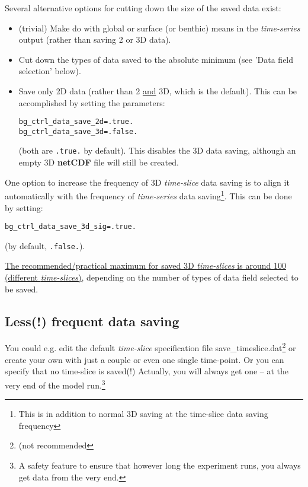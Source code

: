 \documentclass[11pt,fleqn]{book} %
\begin{document}
Several alternative options for cutting down the size of the saved data exist:

\vspace{1mm}
\begin{itemize}
\item (trivial) Make do with global or surface (or benthic) means in the \textit{time-series} output (rather than saving 2 or 3D data).
\item Cut down the types of data saved to the absolute minimum (see 'Data field selection' below).
\item Save only 2D data (rather than 2 \uline{and} 3D, which is the default). This can be accomplished by setting the parameters:
\vspace{-1mm}\begin{verbatim}
bg_ctrl_data_save_2d=.true.
bg_ctrl_data_save_3d=.false.
\end{verbatim}\vspace{-1mm}
(both are \texttt{.true.} by default). This disables the 3D data saving, although an empty 3D \textbf{netCDF} file will still be created.
\end{itemize}

\noindent One option to increase the frequency of 3D \textit{time-slice} data saving is to align it automatically with the frequency of \textit{time-series} data saving\footnote{This is in addition to normal 3D saving at the time-slice data saving frequency}. This can be done by setting:
\vspace{-1mm}\begin{verbatim}
bg_ctrl_data_save_3d_sig=.true.
\end{verbatim}\vspace{-1mm}
(by default, \texttt{.false.}).

\vspace{1mm}
\uline{The recommended/practical maximum for saved 3D \textit{time-slices} is around 100 (different \textit{time-slices})}, depending on the number of types of data field selected to be saved.

%
\subsection{Less(!) frequent data saving}

You could e.g. edit the default \textit{time-slice} specification file \textsf{\footnotesize save\_timeslice.dat}\footnote{(not recommended} or create your own with just a couple or even one single time-point. Or you can specify that no time-slice is saved(!) Actually, you will always get one -- at the very end of the model run.\footnote{A safety feature to ensure that however long the experiment runs, you always get data from the very end.} 
\end{document}
